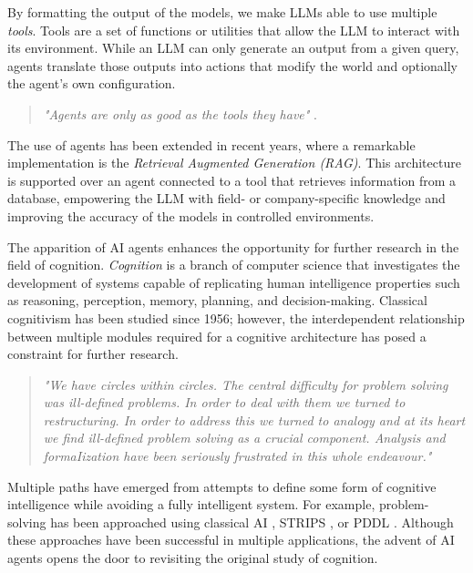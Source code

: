 By formatting the output of the models, we make LLMs able to use
multiple \emph{tools}. Tools are a set of functions or utilities that allow
the LLM to interact with its environment. While an LLM can only generate an
output from a given query, agents translate those outputs into actions that
modify the world and optionally the agent's own configuration.

\begin{quote}
    \small\textit{"Agents are only as good as the tools they have"} \citep{langchain-docs-2024}.
\end{quote}

The use of agents has been extended in recent years, where a remarkable
implementation is the \emph{Retrieval Augmented Generation (RAG)}.  This
architecture is supported over an agent connected to a tool that retrieves
information from a database, empowering the LLM with field- or company-specific
knowledge and improving the accuracy of the models in controlled environments.

The apparition of AI agents enhances the opportunity for further research in the
field of cognition. \emph{Cognition} is a branch of computer science that
investigates the development of systems capable of replicating human
intelligence properties such as reasoning, perception, memory, planning, and
decision-making. Classical cognitivism has been studied since 1956; however, the
interdependent relationship between multiple modules required for a cognitive
architecture has posed a constraint for further research.

\begin{quote}
    \small\textit{
        "We have circles within circles. The central difficulty for problem
        solving was ill-defined problems. In order to deal with them we turned
        to restructuring. In order to address this we turned to analogy and at
        its heart we find ill-defined problem solving as a crucial component.
        Analysis and formaIization have been seriously frustrated in this whole
        endeavour." \citet{vervaeke1999naturalistic}
    }
\end{quote}

Multiple paths have emerged from attempts to define some form of cognitive
intelligence while avoiding a fully intelligent system. For example,
problem-solving has been approached using classical AI
\citep{russell2016artificial}, STRIPS \citep{fikes1971strips}, or PDDL
\citep{aeronautiques1998pddl}. Although these approaches have been successful in
multiple applications, the advent of AI agents opens the door to revisiting the
original study of cognition.

